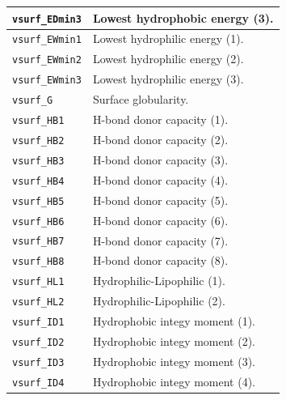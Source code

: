 \documentclass[12pt,a4paper]{article}
\begin{document}
\begin{longtable}{@{\zz}|p{}|p{}|}
\texttt{vsurf\_EDmin3} & Lowest hydrophobic energy (3).\\ \hline

\texttt{vsurf\_EWmin1} & Lowest hydrophilic energy (1).\\ \hline

\texttt{vsurf\_EWmin2} & Lowest hydrophilic energy (2).\\ \hline

\texttt{vsurf\_EWmin3} & Lowest hydrophilic energy (3).\\ \hline

\texttt{vsurf\_G} & Surface globularity.\\ \hline

\texttt{vsurf\_HB1} & H-bond donor capacity (1).\\ \hline

\texttt{vsurf\_HB2} & H-bond donor capacity (2).\\ \hline

\texttt{vsurf\_HB3} & H-bond donor capacity (3).\\ \hline

\texttt{vsurf\_HB4} & H-bond donor capacity (4).\\ \hline

\texttt{vsurf\_HB5} & H-bond donor capacity (5).\\ \hline

\texttt{vsurf\_HB6} & H-bond donor capacity (6).\\ \hline

\texttt{vsurf\_HB7} & H-bond donor capacity (7).\\ \hline

\texttt{vsurf\_HB8} & H-bond donor capacity (8).\\ \hline

\texttt{vsurf\_HL1} & Hydrophilic-Lipophilic (1).\\ \hline

\texttt{vsurf\_HL2} & Hydrophilic-Lipophilic (2).\\ \hline

\texttt{vsurf\_ID1} & Hydrophobic integy moment (1).\\ \hline

\texttt{vsurf\_ID2} & Hydrophobic integy moment (2).\\ \hline

\texttt{vsurf\_ID3} & Hydrophobic integy moment (3).\\ \hline

\texttt{vsurf\_ID4} & Hydrophobic integy moment (4).\\ \hline


\end{longtable}
\end{document}
